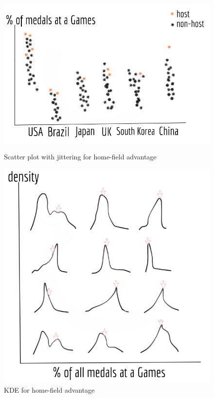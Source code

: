 \documentclass[12pt]{article}
\begin{document}
\begin{figure}[!b]
  \begin{minipage}[b]{0.45\textwidth}
  \centering
    \includegraphics[scale=0.3]{pics/5.png}
    \caption{\small Scatter plot with jittering for home-field advantage}
    \label{fig:1}
  \end{minipage}
  \hfill
  \begin{minipage}[b]{0.45\textwidth}
  \centering
    \includegraphics[scale=0.3]{pics/6.png}
    \caption{\small KDE for home-field advantage}
    \label{fig:2}
  \end{minipage}
\end{figure}
\end{document}
